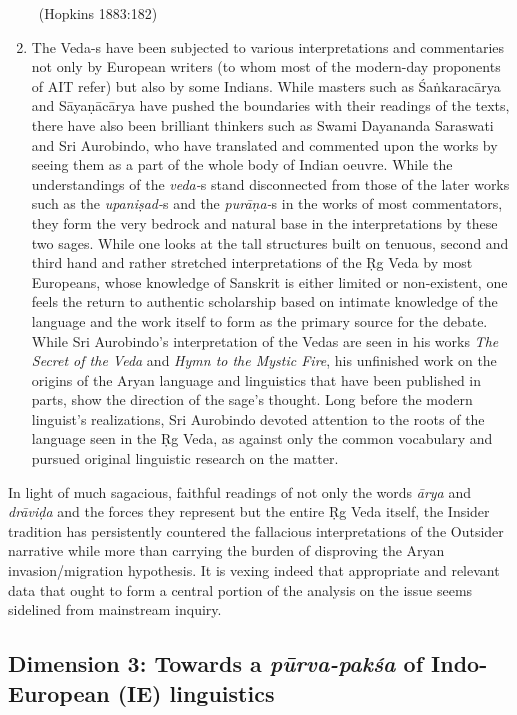 \begin{enumerate}
\begin{myquote}
~\hfill (Hopkins 1883:182)
\end{myquote}


 \item The Veda-s have been subjected to various interpretations and commentaries not only by European writers (to whom most of the modern-day proponents of AIT refer) but also by some Indians. While masters such as Śaṅkaracārya and Sāyaṇācārya have pushed the boundaries with their readings of the texts, there have also been brilliant thinkers such as Swami Dayananda Saraswati and Sri Aurobindo, who have translated and commented upon the works by seeing them as a part of the whole body of Indian oeuvre. While the understandings of the \textit{veda-}s stand disconnected from those of the later works such as the \textit{upaniṣad-}s and the \textit{purāṇa-}s in the works of most commentators, they form the very bedrock and natural base in the interpretations by these two sages. While one looks at the tall structures built on tenuous, second and third hand and rather stretched interpretations of the Ṛg Veda by most Europeans, whose knowledge of Sanskrit is either limited or non-existent, one feels the return to authentic scholarship based on intimate knowledge of the language and the work itself to form as the primary source for the debate. While Sri Aurobindo’s interpretation of the Vedas are seen in his works \textit{The Secret of the Veda} and \textit{Hymn to the Mystic Fire}, his unfinished work on the origins of the Aryan language and linguistics that have been published in parts, show the direction of the sage’s thought. Long before the modern linguist’s realizations, Sri Aurobindo devoted attention to the roots of the language seen in the Ṛg Veda, as against only the common vocabulary and pursued original linguistic research on the matter.

\end{enumerate}

In light of much sagacious, faithful readings of not only the words \textit{ārya} and \textit{drāviḍa} and the forces they represent but the entire Ṛg Veda itself, the Insider tradition has persistently countered the fallacious interpretations of the Outsider narrative while more than carrying the burden of disproving the Aryan invasion/migration hypothesis. It is vexing indeed that appropriate and relevant data that ought to form a central portion of the analysis on the issue seems sidelined from mainstream inquiry.


\subsection{Dimension 3: Towards a \textit{pūrva-pakśa} of Indo-European (IE) linguistics}

